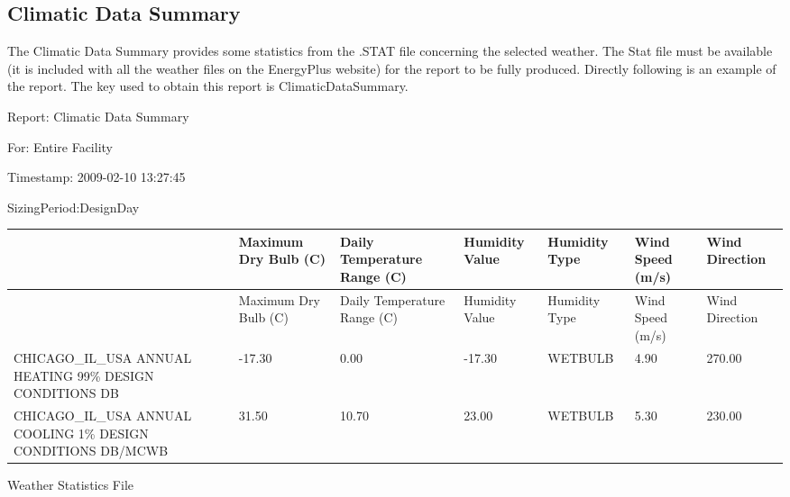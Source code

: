 \subsection{Climatic Data Summary}\label{climatic-data-summary}

The Climatic Data Summary provides some statistics from the .STAT file concerning the selected weather. The Stat file must be available (it is included with all the weather files on the EnergyPlus website) for the report to be fully produced. Directly following is an example of the report. The key used to obtain this report is ClimaticDataSummary.

Report: Climatic Data Summary

For: Entire Facility

Timestamp: 2009-02-10 13:27:45

SizingPeriod:DesignDay

\begin{longtable}[c]{>{\raggedright}p{0.85in}>{\raggedright}p{0.85in}>{\raggedright}p{0.85in}>{\raggedright}p{0.85in}>{\raggedright}p{0.85in}>{\raggedright}p{0.85in}>{\raggedright}p{0.85in}}
\toprule
~ & Maximum Dry Bulb (C) & Daily Temperature Range (C) & Humidity Value & Humidity Type & Wind Speed (m/s) & Wind Direction \tabularnewline
\midrule
\endfirsthead

\toprule
~ & Maximum Dry Bulb (C) & Daily Temperature Range (C) & Humidity Value & Humidity Type & Wind Speed (m/s) & Wind Direction \tabularnewline
\midrule
\endhead

CHICAGO\-\_IL\-\_USA ANNUAL HEATING 99\% DESIGN CONDITIONS DB & -17.30 & 0.00 & -17.30 & WETBULB & 4.90 & 270.00 \tabularnewline
CHICAGO\-\_IL\-\_USA ANNUAL COOLING 1\% DESIGN CONDITIONS DB/MCWB & 31.50 & 10.70 & 23.00 & WETBULB & 5.30 & 230.00 \tabularnewline
\bottomrule
\end{longtable}

Weather Statistics File

